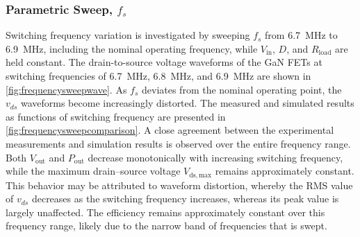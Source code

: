 \documentclass[journal, 9pt, letterpaper, english]{IEEEtran}[2015/08/26]
\begin{document}
\subsubsection{Parametric Sweep, $f_s$}

Switching frequency variation is investigated by sweeping $f_s$ from \qty{6.7}{\mega\hertz} to \qty{6.9}{\mega\hertz}, including the nominal operating frequency, while $V_{\mathrm{in}}$, $D$, and $R_\mathrm{load}$ are held constant.
The drain-to-source voltage waveforms of the GaN FETs at switching frequencies of \qty{6.7}{\mega\hertz}, \qty{6.8}{\mega\hertz}, and \qty{6.9}{\mega\hertz} are shown in \cref{fig:frequencysweepwave}.
As $f_s$ deviates from the nominal operating point, the $v_{ds}$ waveforms become increasingly distorted.
The measured and simulated results as functions of switching frequency are presented in \cref{fig:frequencysweepcomparison}.
A close agreement between the experimental measurements and simulation results is observed over the entire frequency range.
Both $V_{\mathrm{out}}$ and $P_{\mathrm{out}}$ decrease monotonically with increasing switching frequency, while the maximum drain--source voltage $V_{\mathrm{ds,max}}$ remains approximately constant.
This behavior may be attributed to waveform distortion, whereby the RMS value of $v_{ds}$ decreases as the switching frequency increases, whereas its peak value is largely unaffected.
The efficiency remains approximately constant over this frequency range, likely due to the narrow band of frequencies that is swept.\\
\end{document}
